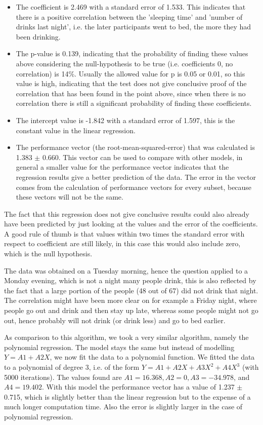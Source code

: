 \documentclass[11pt,a4paper,onecolumn]{article}
\begin{document}
\begin{itemize}
\item 
  The coefficient is 2.469 with a standard error of 1.533. This indicates that there is a positive correlation between the 'sleeping time' and 'number of drinks last night', i.e. the later participants went to bed, the more they had been drinking.
\item
  The p-value is 0.139, indicating that the probability of finding these values above considering the null-hypothesis to be true (i.e. coefficients 0, no correlation) is 14\%. Usually the allowed value for p is 0.05 or 0.01, so this value is high, indicating that the test does not give conclusive proof of the correlation that has been found in the point above, since when there is no correlation there is still a significant probability of finding these coefficients.
\item
  The intercept value is -1.842 with a standard error of 1.597, this is the constant value in the linear regression.
\item
  The performance vector (the root-mean-squared-error) that was calculated is 1.383 $\pm$ 0.660. This vector can be used to compare with other models, in general a smaller value for the performance vector indicates that the regression results give a better prediction of the data. The error in the vector comes from the calculation of performance vectors for every subset, because these vectors will not be the same.
\end{itemize}

The fact that this regression does not give conclusive results could also already have been predicted by just looking at the values and the error of the coefficients. A good rule of thumb is that values within two times the standard error with respect to coefficient are still likely, in this case this would also include zero, which is the null hypothesis. 

The data was obtained on a Tuesday morning, hence the question applied to a Monday evening, which is not a night many people drink, this is also reflected by the fact that a large portion of the people (48 out of 67) did not drink that night. The correlation might have been more clear on for example a Friday night, where people go out and drink and then stay up late, whereas some people might not go out, hence probably will not drink (or drink less) and go to bed earlier.

As comparison to this algorithm, we took a very similar algorithm, namely the polynomial regression. The model stays the same but instead of modelling $Y = A1 + A2 
X$, we now fit the data to a polynomial function. We fitted the data to a polynomial of degree 3, i.e. of the form $Y = A1 + A2 X + A3 X^2 + A4 X^3$ (with 5000 iterations). The values found are $A1 = 16.368, A2 = 0, A3 = -34.978$, and $A4 = 19.402$. With this model the performance vector has a value of 1.237 $\pm$ 0.715, which is slightly better than the linear regression but to the expense of a much longer computation time. Also the error is slightly larger in the case of polynomial regression.
\end{document}

